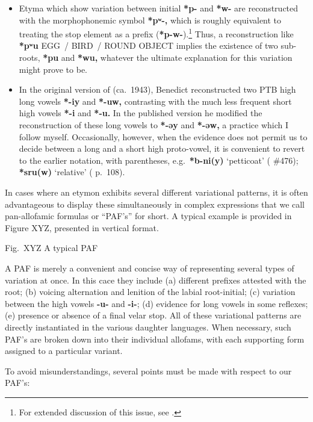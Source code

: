\begin{itemize}
\item Etyma which show variation between initial \textbf{*p-} and \textbf{*w-} are reconstructed with
the morphophonemic symbol \textbf{*pʷ-,} which is roughly equivalent to treating the stop
element as a prefix (\textbf{*p-w-}).\footnote{For extended discussion of this issue,
see \citealt{JAM-EAPW}.} Thus, a reconstruction like \textbf{*pʷu} EGG~/ BIRD~/ ROUND OBJECT
implies the existence of two sub-roots, \textbf{*pu} and \textbf{*wu,} whatever the ultimate
explanation for this variation might prove to be.

\item In the original version of \textit{} (ca.~1943), Benedict reconstructed two PTB high
long vowels \textbf{*-iy} and \textbf{*-uw,} contrasting with the much less frequent short high
vowels \textbf{*-i} and \textbf{*-u.}  In the published version \citeyearpar{STC} he modified the
reconstruction of these long vowels to \textbf{*-əy} and \textbf{*-əw,} a practice which I follow
myself. Occasionally, however, when the evidence does not permit us to decide
between a long and a short high proto-vowel, it is convenient to revert to the
earlier notation, with parentheses, e.g.\ \textbf{*b-ni(y)} ‘petticoat’ (\textit{} \#476);
\textbf{*sru(w)} ‘relative’ (\textit{} p.~108).
\end{itemize}

In cases where an etymon exhibits several different variational patterns, it is often advantageous to display these simultaneously in complex expressions that we call pan-allofamic formulas or “PAF’s” for short. A typical example is provided in Figure XYZ, presented in vertical format.

						
				Fig.~XYZ A typical PAF

A PAF is merely a convenient and concise way of representing several types of variation at once. In this cace they include (a) different prefixes attested with the root; (b) voicing alternation and lenition of the labial root-initial; (c) variation between the high vowels \textbf{-u-} and \textbf{-i-}; (d) evidence for long vowels in some reflexes; (e) presence or absence of a final velar stop. All of these variational patterns are directly instantiated in the various daughter languages. When necessary, such PAF’s are broken down into their individual allofams, with each supporting form assigned to a particular variant.

To avoid misunderstandings, several points must be made with respect to our PAF’s:

